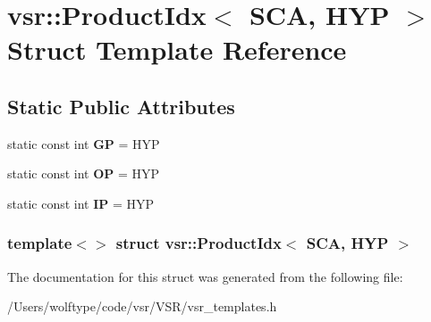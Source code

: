 \hypertarget{structvsr_1_1_product_idx_3_01_s_c_a_00_01_h_y_p_01_4}{\section{vsr\-:\-:Product\-Idx$<$ S\-C\-A, H\-Y\-P $>$ Struct Template Reference}
\label{structvsr_1_1_product_idx_3_01_s_c_a_00_01_h_y_p_01_4}
}
\subsection*{Static Public Attributes}
\begin{DoxyCompactItemize}
\item 
\hypertarget{structvsr_1_1_product_idx_3_01_s_c_a_00_01_h_y_p_01_4_a119a3178f4528d7dfcba0b64ac349681}{static const int {\bfseries G\-P} = H\-Y\-P}\label{structvsr_1_1_product_idx_3_01_s_c_a_00_01_h_y_p_01_4_a119a3178f4528d7dfcba0b64ac349681}

\item 
\hypertarget{structvsr_1_1_product_idx_3_01_s_c_a_00_01_h_y_p_01_4_a0497ab9b32088be042028467bd7a4b4a}{static const int {\bfseries O\-P} = H\-Y\-P}\label{structvsr_1_1_product_idx_3_01_s_c_a_00_01_h_y_p_01_4_a0497ab9b32088be042028467bd7a4b4a}

\item 
\hypertarget{structvsr_1_1_product_idx_3_01_s_c_a_00_01_h_y_p_01_4_a5753f1f9ea57381ecc42a91da1f45c9c}{static const int {\bfseries I\-P} = H\-Y\-P}\label{structvsr_1_1_product_idx_3_01_s_c_a_00_01_h_y_p_01_4_a5753f1f9ea57381ecc42a91da1f45c9c}

\end{DoxyCompactItemize}
\subsubsection*{template$<$$>$ struct vsr\-::\-Product\-Idx$<$ S\-C\-A, H\-Y\-P $>$}



The documentation for this struct was generated from the following file\-:\begin{DoxyCompactItemize}
\item 
/\-Users/wolftype/code/vsr/\-V\-S\-R/vsr\-\_\-templates.\-h\end{DoxyCompactItemize}
